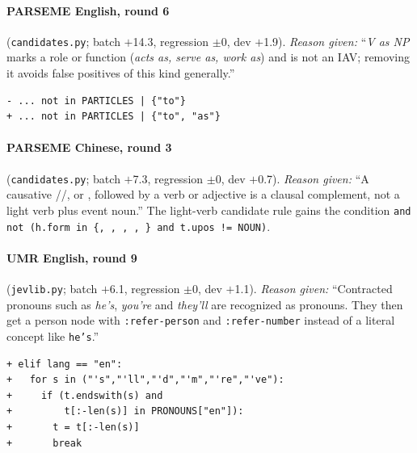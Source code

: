 \paragraph{PARSEME English, round 6} (\texttt{candidates.py}; batch $+$14.3, regression $\pm$0, dev $+$1.9). \emph{Reason given:} ``\emph{V as NP} marks a role or function (\emph{acts as, serve as, work as}) and is not an IAV; removing it avoids false positives of this kind generally.''
{\footnotesize
\begin{verbatim}
- ... not in PARTICLES | {"to"}
+ ... not in PARTICLES | {"to", "as"}
\end{verbatim}}

\paragraph{PARSEME Chinese, round 3} (\texttt{candidates.py}; batch $+$7.3, regression $\pm$0, dev $+$0.7). \emph{Reason given:} ``A causative //, or , followed by a verb or adjective is a clausal complement, not a light verb plus event noun.'' The light-verb candidate rule gains the condition \texttt{and not (h.form in \{, , , , \} and t.upos != NOUN)}.

\paragraph{UMR English, round 9} (\texttt{jevlib.py}; batch $+$6.1, regression $\pm$0, dev $+$1.1). \emph{Reason given:} ``Contracted pronouns such as \emph{he's}, \emph{you're} and \emph{they'll} are recognized as pronouns. They then get a person node with \texttt{:refer-person} and \texttt{:refer-number} instead of a literal concept like \texttt{he's}.''
{\footnotesize
\begin{verbatim}
+ elif lang == "en":
+   for s in ("'s","'ll","'d","'m","'re","'ve"):
+     if (t.endswith(s) and
+         t[:-len(s)] in PRONOUNS["en"]):
+       t = t[:-len(s)]
+       break
\end{verbatim}}

